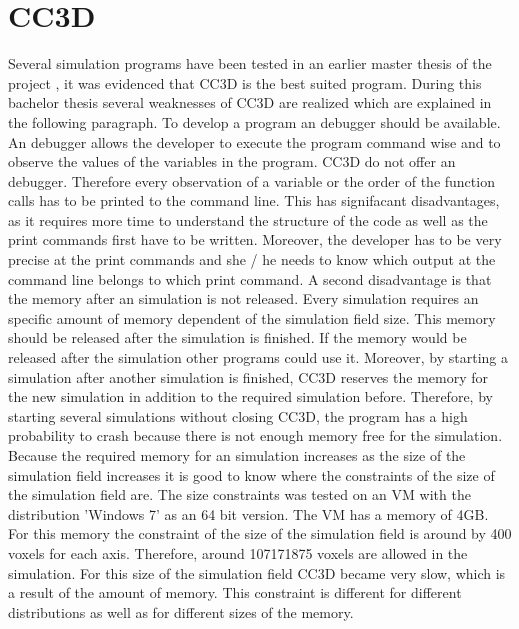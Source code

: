 \section{CC3D}
Several simulation programs have been tested in an earlier master thesis of the project \cite{MSCAngelo}, it was evidenced that \ac{CC3D} is the best suited program. During this bachelor thesis several weaknesses of \ac{CC3D} are realized which are explained in the following paragraph. \newline
To develop a program an debugger should be available. An debugger allows the developer to execute the program command wise and to observe the values of the variables in the program. \ac{CC3D} do not offer an debugger. Therefore every observation of a variable or the order of the function calls has to be printed to the command line. This has signifacant disadvantages, as it requires more time to understand the structure of the code as well as the print commands first have to be written. Moreover, the developer has to be very precise at the print commands and she / he needs to know which output at the command line belongs to which print command. \newline
A second disadvantage is that the memory after an simulation is not released. Every simulation requires an specific amount of memory dependent of the simulation field size. This memory should be released after the simulation is finished. If the memory would be released after the simulation other programs could use it. Moreover, by starting a simulation after another simulation is finished, \ac{CC3D} reserves the memory for the new simulation in addition to the required simulation before. Therefore, by starting several simulations without closing \ac{CC3D}, the program has a high probability to crash because there is not enough memory free for the simulation. \newline
Because the required memory for an simulation increases as the size of the simulation field increases it is good to know where the constraints of the size of the simulation field are. The size constraints was tested on an \ac{VM} with the distribution 'Windows 7' as an 64 bit version. The \ac{VM} has a memory of 4GB. For this memory the constraint of the size of the simulation field is around by 400 voxels for each axis. Therefore, around 107171875 voxels are allowed in the simulation. For this size of the simulation field \ac{CC3D} became very slow, which is a result of the amount of memory. This constraint is different for different distributions as well as for different sizes of the memory. 

